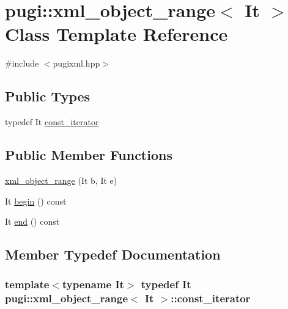 \hypertarget{classpugi_1_1xml__object__range}{\section{pugi\-:\-:xml\-\_\-object\-\_\-range$<$ It $>$ Class Template Reference}
\label{classpugi_1_1xml__object__range}
}


{\ttfamily \#include $<$pugixml.\-hpp$>$}

\subsection*{Public Types}
\begin{DoxyCompactItemize}
\item 
typedef It \hyperlink{classpugi_1_1xml__object__range_ace38fcf448c7134e13612f7ce439246c}{const\-\_\-iterator}
\end{DoxyCompactItemize}
\subsection*{Public Member Functions}
\begin{DoxyCompactItemize}
\item 
\hyperlink{classpugi_1_1xml__object__range_abf214db65eac081e4478169cb03bce67}{xml\-\_\-object\-\_\-range} (It b, It e)
\item 
It \hyperlink{classpugi_1_1xml__object__range_ad8d64cefea10330a0f975fbb13a99a8a}{begin} () const 
\item 
It \hyperlink{classpugi_1_1xml__object__range_ad2c9b91aca1c3d4761c767af29a9d7ff}{end} () const 
\end{DoxyCompactItemize}


\subsection{Member Typedef Documentation}
\hypertarget{classpugi_1_1xml__object__range_ace38fcf448c7134e13612f7ce439246c}{
\subsubsection[{const\-\_\-iterator}]{\setlength{\rightskip}{0pt plus 5cm}template$<$typename It$>$ typedef It {\bf pugi\-::xml\-\_\-object\-\_\-range}$<$ It $>$\-::{\bf const\-\_\-iterator}}}\label{classpugi_1_1xml__object__range_ace38fcf448c7134e13612f7ce439246c}



